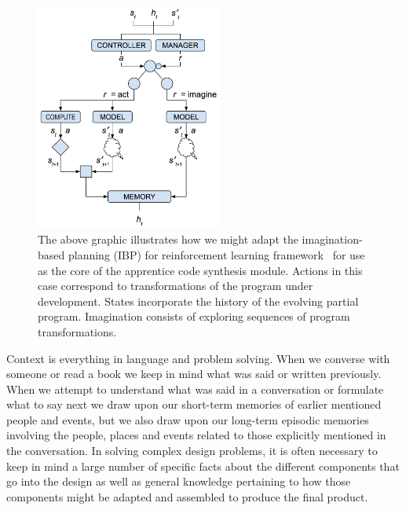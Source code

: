 
\begin{figure}
%
  \begin{center} 
    \includegraphics[width=175pt]{./figures/Graph_Nets_Imagination_Coding.png} %
  \end{center}
%
  \caption{The above graphic illustrates how we might adapt the imagination-based planning (IBP) for reinforcement learning framework~\cite{PascanuetalCoRR-17} for use as the core of the apprentice code synthesis module. Actions in this case correspond to transformations of the program under development. States incorporate the history of the evolving partial program. Imagination consists of exploring sequences of program transformations.}
%
  \label{Graph_Nets_Imagination_Coding}
%
\end{figure}


Context is everything in language and problem solving. When we converse with someone or read a book we keep in mind what was said or written previously. When we attempt to understand what was said in a conversation or formulate what to say next we draw upon our short-term memories of earlier mentioned people and events, but we also draw upon our long-term episodic memories involving the people, places and events related to those explicitly mentioned in the conversation. In solving complex design problems, it is often necessary to keep in mind a large number of specific facts about the different components that go into the design as well as general knowledge pertaining to how those components might be adapted and assembled to produce the final product. 

